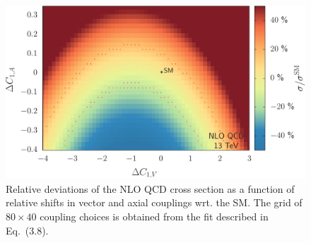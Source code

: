 \documentclass{JHEP3}
\begin{document}
\begin{figure}[t]
\centering
\includegraphics[scale=0.6]{LHC_53_SigmaNLO.pdf}
\caption{ \label{fig:viii} Relative deviations of the NLO QCD cross section as a function of relative shifts in vector and axial couplings wrt. the SM.
The grid of $ 80 \times 40 $ coupling choices is obtained from the fit described in Eq.~(3.8). }
\end{figure}
\end{document}
